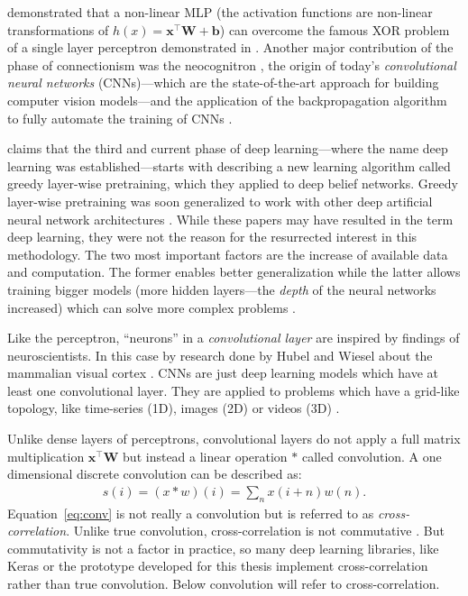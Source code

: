 \documentclass[]{article}
\begin{document}
\citet{hornik_et_al_1989} demonstrated that a non-linear MLP
(the activation functions are non-linear transformations of
$h(x) = \mathbf{x}^\top \mathbf{W} + \mathbf{b}$) can overcome the
famous XOR problem of a single layer perceptron demonstrated in
\citet{minsky_et_al_1969}.
Another major contribution of the phase of connectionism was the
neocognitron \citep{fukushima_1980}, the origin of today's
\textit{convolutional neural networks} (CNNs)---which are the
state-of-the-art approach for building computer vision models---and
the application of the backpropagation algorithm to fully automate the
training of CNNs \citep{lecun_et_al_1989}.

\citet{goodfellow_et_al_2016} claims that the third and current phase
of deep learning---where the name deep learning was
established---starts with \citet{hinton_et_al_2006} describing a new
learning algorithm called greedy layer-wise pretraining, which they
applied to deep belief networks.
Greedy layer-wise pretraining was soon generalized to work with other
deep artificial neural network architectures
\citep{renzato_et_al_2006, bengio_et_al_2007}.
While these papers may have resulted in the term deep learning,
they were not the reason for the resurrected interest in this
methodology.
The two most important factors are the increase of available data
and computation.
The former enables better generalization while the latter allows
training bigger models (more hidden layers---the \textit{depth} of the
neural networks increased) which can solve more complex problems
\citep{goodfellow_et_al_2016}.

Like the perceptron, ``neurons'' in a \textit{convolutional layer}
are inspired by findings of neuroscientists.
In this case by research done by Hubel and Wiesel about the
mammalian visual cortex
\citep{hubel_et_al_1959, hubel_et_al_1962, hubel_et_al_1968}.
CNNs are just deep learning models which have at least one
convolutional layer. They are applied to problems which have a
grid-like topology, like time-series (1D), images (2D) or videos (3D)
\citep{goodfellow_et_al_2016}.

Unlike dense layers of perceptrons, convolutional layers do not apply
a full matrix multiplication $\mathbf{x}^\top\mathbf{W}$ but instead
a linear operation $*$ called convolution.
A one dimensional discrete convolution can be described as:
\begin{align}
  \label{eq:conv}
  s(i) = (x * w)(i) = \sum_n x(i + n)w(n).
\end{align}
Equation~\ref{eq:conv} is not really a convolution but is referred to
as \textit{cross-correlation}.
Unlike true convolution, cross-correlation is not commutative
\citep{goodfellow_et_al_2016}.
But commutativity is not a factor in practice, so many deep learning
libraries, like Keras \citep{keras} or the prototype developed for
this thesis implement cross-correlation rather than true convolution.
Below convolution will refer to cross-correlation.
\end{document}
